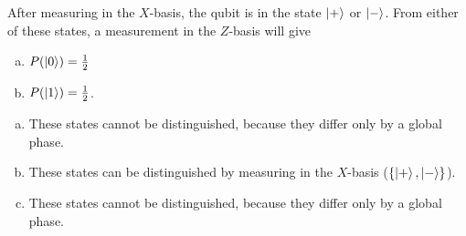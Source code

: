 \documentclass[12pt]{extarticle}
\begin{document}
After measuring in the $X$-basis, the qubit is in the state $\ket{+}$ or $\ket{-}$.
From either of these states, a measurement in the $Z$-basis will give
\begin{enumerate}[(a)]
\item $P(\ket{0})=\frac{1}{2}$
\item $P(\ket{1})=\frac{1}{2}$.
\end{enumerate}


\begin{enumerate}[(a)]
\item These states cannot be distinguished, because they differ only by a global phase.
\item These states can be distinguished by measuring in the $X$-basis ($\{\ket{+},\ket{-}\}$).
\item These states cannot be distinguished, because they differ only by a global phase.
\end{enumerate}

\end{document}
